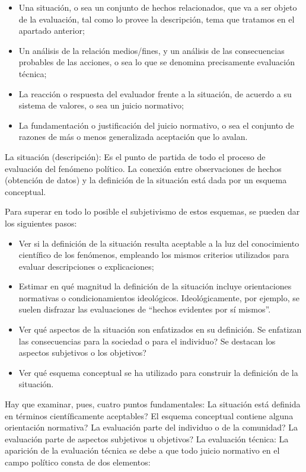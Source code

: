 \documentclass[
]{book}
\providecommand{\tightlist}{%
  \setlength{\itemsep}{0pt}\setlength{\parskip}{0pt}}
\begin{document}
\begin{itemize}
\tightlist
\item
  Una situación, o sea un conjunto de hechos relacionados, que va a ser objeto de la evaluación, tal como lo provee la descripción, tema que tratamos en el apartado anterior;
\item
  Un análisis de la relación medios/fines, y un análisis de las consecuencias probables de las acciones, o sea lo que se denomina precisamente evaluación técnica;
\item
  La reacción o respuesta del evaluador frente a la situación, de acuerdo a su sistema de valores, o sea un juicio normativo;
\item
  La fundamentación o justificación del juicio normativo, o sea el conjunto de razones de más o menos generalizada aceptación que lo avalan.
\end{itemize}

La situación (descripción): Es el punto de partida de todo el proceso de evaluación del fenómeno político. La conexión entre observaciones de hechos (obtención de datos) y la definición de la situación está dada por un esquema conceptual.

Para superar en todo lo posible el subjetivismo de estos esquemas, se pueden dar los siguientes pasos:

\begin{itemize}
\item
  Ver si la definición de la situación resulta aceptable a la luz del conocimiento científico de los fenómenos, empleando los mismos criterios utilizados para evaluar descripciones o explicaciones;
\item
  Estimar en qué magnitud la definición de la situación incluye orientaciones normativas o condicionamientos ideológicos. Ideológicamente, por ejemplo, se suelen disfrazar las evaluaciones de ``hechos evidentes por sí mismos''.
\item
  Ver qué aspectos de la situación son enfatizados en su definición. Se enfatizan las consecuencias para la sociedad o para el individuo? Se destacan los aspectos subjetivos o los objetivos?
\item
  Ver qué esquema conceptual se ha utilizado para construir la definición de la situación.
\end{itemize}

Hay que examinar, pues, cuatro puntos fundamentales: La situación está definida en términos científicamente aceptables? El esquema conceptual contiene alguna orientación normativa? La evaluación parte del individuo o de la comunidad? La evaluación parte de aspectos subjetivos u objetivos? La evaluación técnica: La aparición de la evaluación técnica se debe a que todo juicio normativo en el campo político consta de dos elementos:
\end{document}
